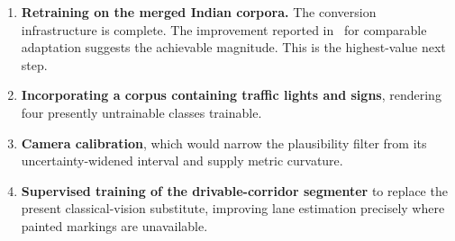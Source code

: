 \documentclass[11pt,a4paper]{report}
\begin{document}
\begin{enumerate}[leftmargin=1.6em,itemsep=3pt]
  \item \textbf{Retraining on the merged Indian corpora.} The conversion
        infrastructure is complete. The improvement reported
        in~\cite{iisc2025uvh26} for comparable adaptation suggests the
        achievable magnitude. This is the highest-value next step.
  \item \textbf{Incorporating a corpus containing traffic lights and signs},
        rendering four presently untrainable classes trainable.
  \item \textbf{Camera calibration}, which would narrow the plausibility filter
        from its uncertainty-widened interval and supply metric curvature.
  \item \textbf{Supervised training of the drivable-corridor segmenter} to
        replace the present classical-vision substitute, improving lane
        estimation precisely where painted markings are unavailable.
\end{enumerate}
\end{document}
